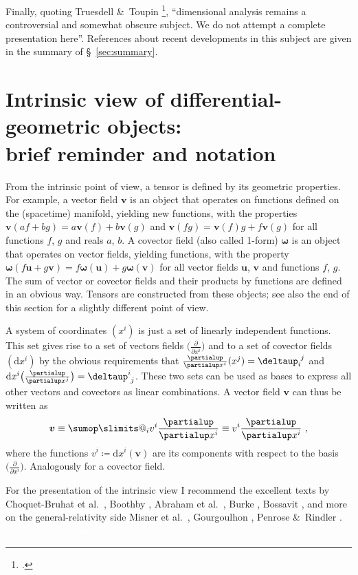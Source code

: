 \documentclass[\ifafour a4paper,12pt,\else a5paper,10pt,\fi%
onecolumn,oneside,article,%
british%
]{memoir}
\makeatletter
\theoremstyle{remark}
\theoremstyle{innote}
\def\sum{\DOTSI\sumop\slimits@}
\newcommand*{\citep}{\footcites}
\newcommand*{\citey}{\parencites*}%
\newcommand*{\amp}{\&}
\newcommand*{\de}{\partialup}%
\newcommand*{\delt}{\deltaup}%
\newcommand*{\di}{\mathrm{d}}%
\newcommand*{\defd}{\coloneqq}
\newcommand*{\dotv}{\mathord{\,\cdot\,}}%
\renewcommand*{\|}[1][]{\nonscript\,#1\vert\nonscript\;\mathopen{}}
\newcommand*{\sect}{\S}%
\newcommand*{\chap}{ch.}%
\newcommand*{\etal}{{et al.}}
\newcommand*{\yom}{\bm{\omega}}
\newcommand*{\yv}{\bm{v}}
\newcommand*{\yu}{\bm{u}}
\renewcommand*{\i}{\indices}
\newcommand*{\dex}[1][i]{\frac{\de}{\de x^{#1}}}
\newcommand*{\dix}[1][i]{\di x^{#1}}
\makeatother
\begin{document}
Finally, quoting Truesdell \amp\ Toupin \citep[Appendix \sect~7
footnote~4]{truesdelletal1960}, \enquote{dimensional analysis remains a
  controversial and somewhat obscure subject. We do not attempt a complete
  presentation here}. References about recent developments in this subject
are given in the summary of \sect~\ref{sec:summary}.




\section{Intrinsic view of differential-geometric objects:\\ brief
  reminder and notation}
\label{sec:remined}


From the intrinsic point of view, a tensor is defined by its geometric
properties. For example, a vector field $\yv$ %
is an object that operates on functions defined on the (spacetime)
manifold, yielding new functions, with the properties
$\yv(af+bg)=a\yv(f)+b\yv(g)$ and $\yv(fg)=\yv(f)g+f\yv(g)$ for all
functions $f$, $g$ and reals $a$, $b$. A covector field (also called
1-form) $\yom$ is an object that operates on vector fields, yielding
functions, with the property $\yom(f\yu+g\yv)=f\yom(\yu)+g\yom(\yv)$ for
all vector fields $\yu$, $\yv$ and functions $f$, $g$. The sum of vector or
covector fields and their products by functions are defined in an obvious
way. Tensors are constructed from these objects; see also the end of this
section for a slightly different point of view.

A system of coordinates $(x^{i})$ is just a set of linearly independent
functions. This set gives rise to a set of vectors fields
$\bigl(\dex\bigr)$ and to a set of covector fields $(\dix)$ by the obvious
requirements that $\dex(x^{j})=\delt\i{_{i}^{j}}$ and
$\dix\bigl(\dex[j]\bigr)=\delt\i{^{i}_{j}}$. These two sets can be used as bases
to express all other vectors and covectors as linear combinations. A
vector field $\yv$ can thus be written as
\begin{equation}
  \label{eq:vector_intrinsic}
  \yv \equiv \sum_{i}v^{i}\dex \equiv v^{i}\dex \ ,
\end{equation}
where the functions $v^{i}\defd \dix(\yv)$ are its components with respect
to the basis $\bigl(\dex\bigr)$. Analogously for a covector field.

\medskip

For the presentation of the intrinsic view I recommend the excellent texts
by Choquet-Bruhat \etal\ \citey{choquetbruhatetal1977_r1996}, Boothby
\citey{boothby1975_r2003}, Abraham \etal\ \citey{abrahametal1983_r1988},
Burke \citey{burke1985_r1987}, Bossavit \citey{bossavit1991}, and more on
the general-relativity side Misner \etal\
\citey[\chap~9]{misneretal1970_r1973}, Gourgoulhon
\citey[\chap~2]{gourgoulhon2007_r2012}, Penrose \amp\ Rindler
\citey[\chap~4]{penroseetal1984_r2003}. \textcolor{white}{If you find this
  you can claim a postcard from me.}
\end{document}
